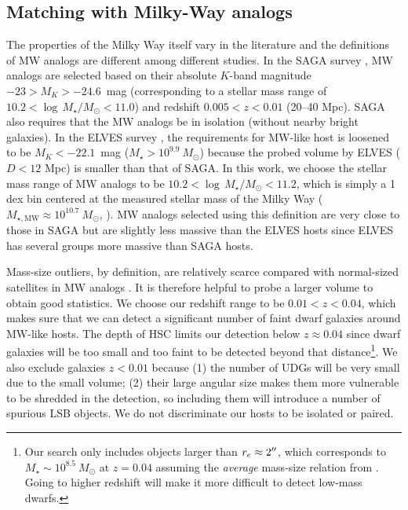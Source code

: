 \documentclass[twocolumn,astrosymb,twocolappendix]{aastex631}
\begin{document}
\begin{CJK*}{UTF8}{gbsn}
\subsection{Matching with Milky-Way analogs}\label{sec:match}
The properties of the Milky Way itself vary in the literature \citep{Licquia2015,Bland-Hawthorn2016} and the definitions of MW analogs are different among different studies. In the SAGA survey \citep{SAGA-I,SAGA-II}, MW analogs are selected based on their absolute $K$-band magnitude $-23 > M_K > -24.6$~mag (corresponding to a stellar mass range of $10.2 < \log\, M_\star/M_\odot < 11.0$) and redshift $0.005 < z < 0.01$ (20--40 Mpc). SAGA also requires that the MW analogs be in isolation (without nearby bright galaxies). In the ELVES survey \citep{ELVES-I,ELVES-II,CarlstenELVES2022}, the requirements for MW-like host is loosened to be $M_K < -22.1$~mag ($M_\star > 10^{9.9}\ M_\odot$) because the probed volume by ELVES ($D<12$ Mpc) is smaller than that of SAGA. In this work, we choose the stellar mass range of MW analogs to be $10.2 < \log\, M_\star/M_\odot < 11.2$, which is simply a 1 dex bin centered at the measured stellar mass of the Milky Way ($M_{\star, \mathrm{MW}}\approx 10^{10.7}\ M_\odot$, \citealt{Licquia2015}). MW analogs selected using this definition are very close to those in SAGA but are slightly less massive than the ELVES hosts since ELVES has several groups more massive than SAGA hosts.

Mass-size outliers, by definition, are relatively scarce compared with normal-sized satellites in MW analogs \citep{SAGA-II,CarlstenELVES2022}. It is therefore helpful to probe a larger volume to obtain good statistics. We choose our redshift range to be $0.01 < z < 0.04$, which makes sure that we can detect a significant number of faint dwarf galaxies around MW-like hosts. The depth of HSC limits our detection below $z \approx 0.04$ since dwarf galaxies will be too small and too faint to be detected beyond that distance\footnote{Our search only includes objects larger than $r_e\approx 2\mbox{$^{\prime\prime}$}$, which corresponds to $M_\star \sim 10^{8.5}\ M_\odot$ at $z=0.04$ assuming the \textit{average} mass-size relation from \citet{ELVES-I}. Going to higher redshift will make it more difficult to detect low-mass dwarfs.}. We also exclude galaxies $z<0.01$ because (1) the number of UDGs will be very small due to the small volume; (2) their large angular size makes them more vulnerable to be shredded in the detection, so including them will introduce a number of spurious LSB objects. We do not discriminate our hosts to be isolated or paired.


\end{CJK*}
\end{document}
